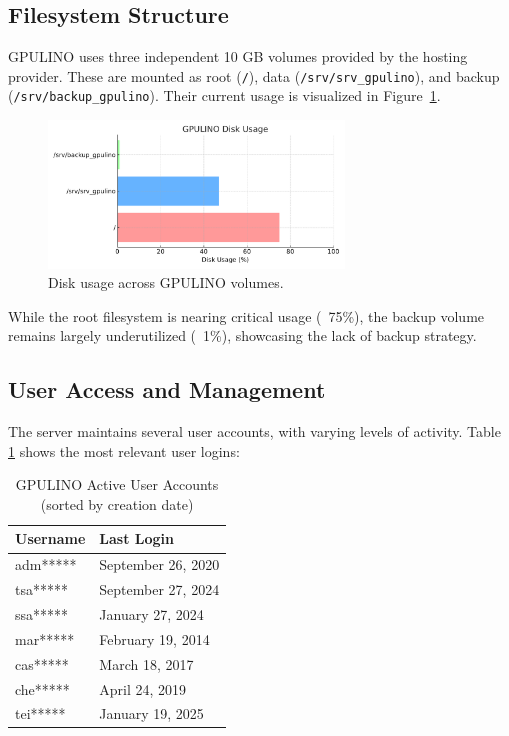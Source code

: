 \subsection*{Filesystem Structure}

GPULINO uses three independent 10 GB volumes provided by the hosting provider. These are mounted as root (\verb|/|), data (\verb|/srv/srv_gpulino|), and backup (\verb|/srv/backup_gpulino|). Their current usage is visualized in Figure~\ref{fig:gpulino_disk_usage}.

\begin{figure}[H]
  \centering
  \includegraphics[width=0.7\textwidth]{figuras/gpulino_disk_usage.pdf}
  \caption{Disk usage across GPULINO volumes.}
  \label{fig:gpulino_disk_usage}
\end{figure}

While the root filesystem is nearing critical usage (~75\%), the backup volume remains largely underutilized (~1\%), showcasing the lack of backup strategy.

\subsection*{User Access and Management}

The server maintains several user accounts, with varying levels of activity. Table \ref{tab:gpulino_users} shows the most relevant user logins:

\begin{table}[H]
  \centering
  \caption{GPULINO Active User Accounts (sorted by creation date)}
  \label{tab:gpulino_users}
  \begin{tabular}{ll}
    \rowcolor{udcpink!25}
    \textbf{Username} & \textbf{Last Login} \\
    \hline
    adm***** & September 26, 2020 \\
    tsa***** & September 27, 2024 \\
    ssa***** & January 27, 2024 \\
    mar***** & February 19, 2014 \\
    cas***** & March 18, 2017 \\
    che***** & April 24, 2019 \\
    tei***** & January 19, 2025 \\
  \end{tabular}
\end{table}

